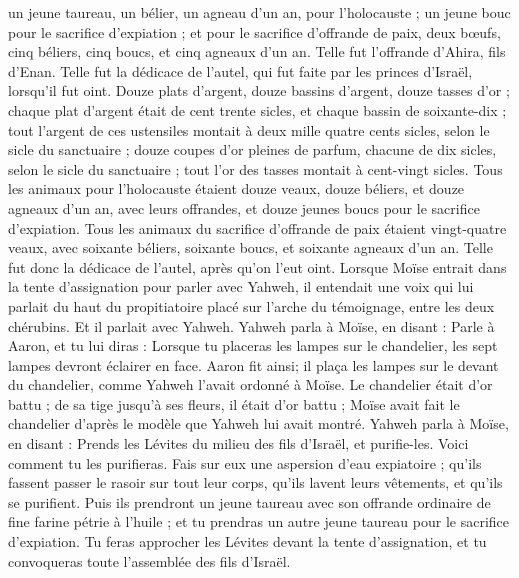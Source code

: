 \begin{multicols}{2}
un jeune taureau, un bélier, un agneau d'un an, pour l'holocauste ;
un jeune bouc pour le sacrifice d’expiation ;
et pour le sacrifice d’offrande de paix, deux bœufs, cinq béliers, cinq boucs, et cinq agneaux d'un an. Telle fut l'offrande d'Ahira, fils d’Enan.
Telle fut la dédicace de l'autel, qui fut faite par les princes d'Israël, lorsqu'il fut oint. Douze plats d'argent, douze bassins d'argent, douze tasses d'or ;
chaque plat d'argent était de cent trente sicles, et chaque bassin de soixante-dix ; tout l'argent de ces ustensiles montait à deux mille quatre cents sicles, selon le sicle du sanctuaire ;
douze coupes d'or pleines de parfum, chacune de dix sicles, selon le sicle du sanctuaire ; tout l'or des tasses montait à cent-vingt sicles.
Tous les animaux pour l'holocauste étaient douze veaux, douze béliers, et douze agneaux d'un an, avec leurs offrandes, et douze jeunes boucs pour le sacrifice d’expiation.
Tous les animaux du sacrifice d’offrande de paix étaient vingt-quatre veaux, avec soixante béliers, soixante boucs, et soixante agneaux d'un an. Telle fut donc la dédicace de l'autel, après qu’on l’eut oint.
Lorsque Moïse entrait dans la tente d'assignation pour parler avec Yahweh, il entendait une voix qui lui parlait du haut du propitiatoire placé sur l'arche du témoignage, entre les deux chérubins. Et il parlait avec Yahweh.
\VerseOne{}Yahweh parla à Moïse, en disant :
Parle à Aaron, et tu lui diras : Lorsque tu placeras les lampes sur le chandelier, les sept lampes devront éclairer en face.
Aaron fit ainsi; il plaça les lampes sur le devant du chandelier, comme Yahweh l'avait ordonné à Moïse.
Le chandelier était d'or battu ; de sa tige jusqu’à ses fleurs, il était d’or battu ; Moïse avait fait le chandelier d’après le modèle que Yahweh lui avait montré.
Yahweh parla à Moïse, en disant :
Prends les Lévites du milieu des fils d'Israël, et purifie-les.
Voici comment tu les purifieras. Fais sur eux une aspersion d'eau expiatoire ; qu’ils fassent passer le rasoir sur tout leur corps, qu’ils lavent leurs vêtements, et qu’ils se purifient.
Puis ils prendront un jeune taureau avec son offrande ordinaire de fine farine pétrie à l'huile ; et tu prendras un autre jeune taureau pour le sacrifice d’expiation.
Tu feras approcher les Lévites devant la tente d’assignation, et tu convoqueras toute l'assemblée des fils d'Israël.

\end{multicols}
